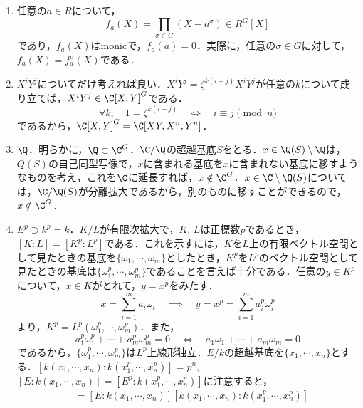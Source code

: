 \documentclass[a4paper,10pt]{ltjsarticle}
\begin{document}
\begin{enumerate}[]
\begin{align*}
    \begin{bmatrix}
      x_1 & x_2 & \cdots & x_n
    \end{bmatrix}
    \det(xE - [a_{ij}]) = 0 \\
    &\implies \det(xE - [a_{ij}]) = 0.
  \end{align*}
  最後の式は，$x$が$R$上整であることを示している．元の問題に戻ると，$F$は$R$上で整であるから，$R$は体である．
  \item \label{enshu:1.44} 任意の$a \in R$について，
  \[ f_a(X) = \prod_{\sigma\in G} (X - a^{\sigma}) \in R^G[X] \]
  であり，$f_a(X)$はmonicで，$f_a(a) = 0$．実際に，任意の$\sigma \in G$に対して，$f_a(X) = f_a^{\sigma}(X)$である．
  \item \label{enshu:1.45} $X^iY^j$についてだけ考えれば良い．$X^iY^j = \zeta^{k(i - j)}X^iY^j$が任意の$k$について成り立てば，$X^iY^j\in\C[X, Y]^G$である．
  \[ \forall k,\quad 1 = \zeta^{k(i - j)} \quad \Longleftrightarrow \quad i \equiv j \pmod n \]
  であるから，$\C[X, Y]^G = \C[XY, X^n, Y^n]$．
  \item \label{enshu:1.46} $\Q$．明らかに，$\Q\subset \C^G$．$\C/\Q$の超越基底$S$をとる．$x \in \Q(S)\setminus\Q$は，$Q(S)$の自己同型写像で，$x$に含まれる基底を$x$に含まれない基底に移すようなものを考え，これを$\C$に延長すれば，$x\notin \C^G$．$x \in \C\setminus\Q(S)$については，$\C/\Q(S)$が分離拡大であるから，別のものに移すことができるので，$x \notin \C^G$．
  \item \label{enshu:1.47} $E^p \supset k^p = k$．$K/L$が有限次拡大で，$K$, $L$は正標数$p$であるとき，$[K:L]=[K^p:L^p]$である．これを示すには，$K$を$L$上の有限ベクトル空間として見たときの基底を$\{\omega_1, \cdots, \omega_m\}$としたとき，$K^p$を$L^p$のベクトル空間として見たときの基底は$\{\omega_1^p, \cdots, \omega_m^p\}$であることを言えば十分である．任意の$y \in K^p$について，$x \in K$がとれて，$y = x^p$をみたす．
  \[ x = \sum_{i = 1}^m a_i\omega_i \quad \implies \quad y = x^p = \sum_{i = 1}^m a_i^p\omega_i^p \]
  より，$K^p = L^p(\omega_1^p, \cdots, \omega_m^p)$．また，
  \[ a_1^p\omega_1^p + \cdots + a_m^p\omega_m^p = 0 \quad \Longleftrightarrow \quad a_1\omega_1 + \cdots + a_m\omega_m = 0 \]
  であるから，$\{\omega_1^p, \cdots, \omega_m^p\}$は$L^p$上線形独立．$E/k$の超越基底を$\{x_1, \cdots, x_n\}$とする．$[k(x_1, \cdots, x_n):k(x_1^p, \cdots,x_n^p)] = p^n$, $[E:k(x_1, \cdots, x_n)]=[E^p:k(x_1^p, \cdots, x_n^p)]$に注意すると，
  \begin{align*}
    [E:k(x_1^p, \cdots, x_n^p)] &= [E:k(x_1, \cdots, x_n)][k(x_1, \cdots, x_n):k(x_1^p, \cdots, x_n^p)] \\

\end{align*}
\end{enumerate}
\end{document}
